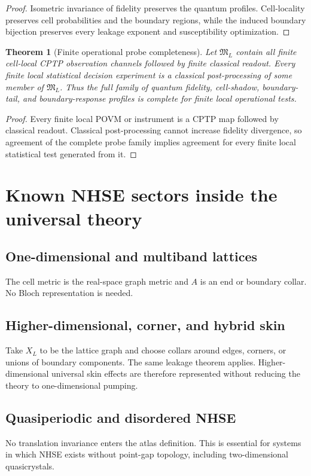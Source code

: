 \documentclass[11pt]{article}
\newtheorem{theorem}{Theorem}
\begin{document}
\begin{proof}
Isometric invariance of fidelity preserves the quantum profiles. Cell-locality preserves cell
probabilities and the boundary regions, while the induced boundary bijection preserves every
leakage exponent and susceptibility optimization.\end{proof}

\begin{theorem}[Finite operational probe completeness]
Let $\mathfrak M_L$ contain all finite cell-local CPTP observation channels followed by finite
classical readout. Every finite local statistical decision experiment is a classical post-processing
of some member of $\mathfrak M_L$. Thus the full family of quantum fidelity, cell-shadow,
boundary-tail, and boundary-response profiles is complete for finite local operational tests.
\end{theorem}

\begin{proof}
Every finite local POVM or instrument is a CPTP map followed by classical readout. Classical
post-processing cannot increase fidelity divergence, so agreement of the complete probe family
implies agreement for every finite local statistical test generated from it.\end{proof}

\section{Known NHSE sectors inside the universal theory}

\subsection{One-dimensional and multiband lattices}
The cell metric is the real-space graph metric and $A$ is an end or boundary collar. No Bloch representation is needed.

\subsection{Higher-dimensional, corner, and hybrid skin}
Take $X_L$ to be the lattice graph and choose collars around edges, corners, or unions of boundary components. The same leakage theorem applies. Higher-dimensional universal skin effects are therefore represented without reducing the theory to one-dimensional pumping. \cite{Universal2D}

\subsection{Quasiperiodic and disordered NHSE}
No translation invariance enters the atlas definition. This is essential for systems in which NHSE exists without point-gap topology, including two-dimensional quasicrystals. \cite{QuasicrystalNHSE}
\end{document}
